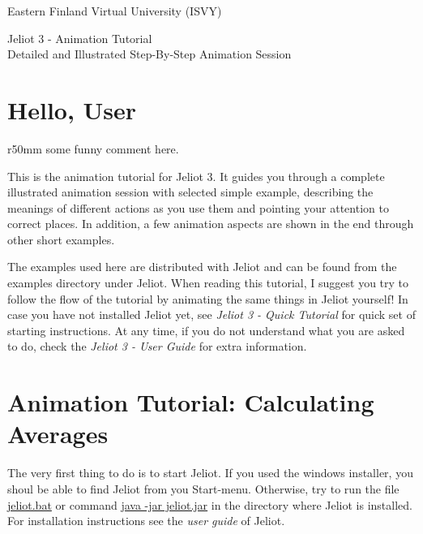 \documentclass[a4paper,12pt,english]{article}
\newcommand{\jel}{Jeliot}
\newcommand{\file}{\url}
\begin{document}
\begin{titlepage}
\begin{flushleft}
Eastern Finland Virtual University (ISVY)
\end{flushleft}
\vfill{}

\Huge{Jeliot 3 - Animation Tutorial} \\
\Large{Detailed and Illustrated Step-By-Step Animation Session}

\vfill{}
\end{titlepage}
\pagebreak

\section*{Hello, User}

\begin{wrapfigure}[11]{r}{50mm}
\vspace{-12pt}
some funny comment here.
\end{wrapfigure}


This is the animation tutorial for \jel{} 3. It guides you through a complete illustrated animation session with selected simple example, describing the meanings of different actions as you use them and pointing your attention to correct places. In addition, a few animation aspects are shown in the end through other short examples.

The examples used here are distributed with \jel{} and can be found from the examples directory under \jel{}. When reading this tutorial, I suggest you try to follow the flow of the tutorial by animating the same things in \jel{}  yourself! In case you have not installed \jel{} yet, see \emph{Jeliot 3 - Quick Tutorial} for quick set of starting instructions. At any time, if you do not understand what you are asked to do, check the \emph{Jeliot 3 - User Guide} for extra information.


\section{Animation Tutorial: Calculating Averages}

The very first thing to do is to start \jel{}. If you used the windows installer, you shoul be able to find \jel{} from you Start-menu. Otherwise, try to run the file \file{jeliot.bat} or command \file{java -jar jeliot.jar} in the directory where \jel{} is installed. For installation instructions see the \emph{user guide} of \jel{}.
\end{document}
